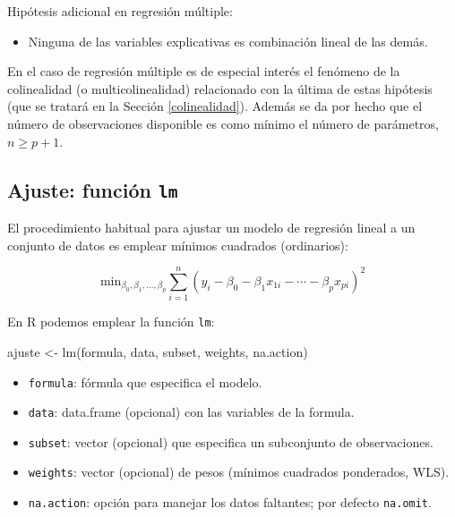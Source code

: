 \documentclass[
]{book}
\newenvironment{Shaded}{\begin{snugshade}}{\end{snugshade}}
\newcommand{\FunctionTok}[1]{\textcolor[rgb]{0.00,0.00,0.00}{#1}}
\newcommand{\NormalTok}[1]{#1}
\newcommand{\OtherTok}[1]{\textcolor[rgb]{0.56,0.35,0.01}{#1}}
\providecommand{\tightlist}{%
  \setlength{\itemsep}{0pt}\setlength{\parskip}{0pt}}
\theoremstyle{break}
\theoremstyle{definition}
\theoremstyle{definition}
\theoremstyle{definition}
\theoremstyle{definition}
\theoremstyle{remark}
\begin{document}
Hipótesis adicional en regresión múltiple:

\begin{itemize}
\tightlist
\item
  Ninguna de las variables explicativas es combinación lineal de las demás.
\end{itemize}

En el caso de regresión múltiple es de especial interés el fenómeno de la colinealidad (o multicolinealidad) relacionado con la última de estas hipótesis (que se tratará en la Sección \ref{colinealidad}).
Además se da por hecho que el número de observaciones disponible es como mínimo el número de parámetros, \(n \geq p + 1\).

\hypertarget{ajuste-funciuxf3n-lm}{%
\subsection{\texorpdfstring{Ajuste: función \texttt{lm}}{Ajuste: función lm}}\label{ajuste-funciuxf3n-lm}}

El procedimiento habitual para ajustar un modelo de regresión lineal a un conjunto de datos es emplear mínimos cuadrados (ordinarios):

\[\mbox{min}_{\beta_{0},\beta_{1},\ldots,\beta_{p}}  \sum\limits_{i=1}^{n}\left(  y_{i} - \beta_0 - \beta_1 x_{1i} - \cdots - \beta_p x_{pi} \right)^{2}\]

En R podemos emplear la función \texttt{lm}:

\begin{Shaded}
\begin{Highlighting}[]
\NormalTok{ajuste }\OtherTok{\textless{}{-}} \FunctionTok{lm}\NormalTok{(formula, data, subset, weights, na.action)}
\end{Highlighting}
\end{Shaded}

\begin{itemize}
\item
  \texttt{formula}: fórmula que especifica el modelo.
\item
  \texttt{data}: data.frame (opcional) con las variables de la formula.
\item
  \texttt{subset}: vector (opcional) que especifica un subconjunto de observaciones.
\item
  \texttt{weights}: vector (opcional) de pesos (mínimos cuadrados ponderados, WLS).
\item
  \texttt{na.action}: opción para manejar los datos faltantes; por defecto \texttt{na.omit}.
\end{itemize}
\end{document}
